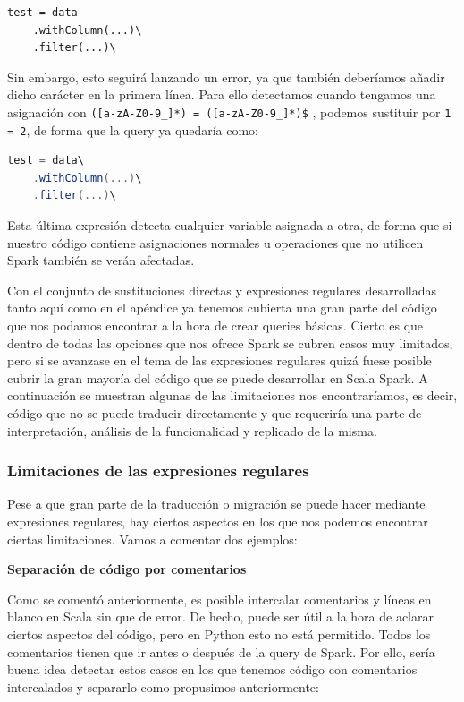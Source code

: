 \documentclass[12pt,twoside,titlepage]{report}
\begin{document}
\begin{lstlisting}
test = data
	.withColumn(...)\
	.filter(...)\
\end{lstlisting}

Sin embargo, esto seguirá lanzando un error, ya que también deberíamos añadir dicho carácter en la primera línea. Para ello detectamos cuando tengamos una asignación con \texttt{([a-zA-Z0-9\_]*) = ([a-zA-Z0-9\_]*)\$}
, podemos sustituir por \texttt{1 = 2}, de forma que la query ya quedaría como:

\begin{lstlisting}[language=scala]
test = data\
	.withColumn(...)\
	.filter(...)\
\end{lstlisting}

Esta última expresión detecta cualquier variable asignada a otra, de forma que si nuestro código contiene asignaciones normales u operaciones que no utilicen Spark también se verán afectadas.

Con el conjunto de sustituciones directas y expresiones regulares desarrolladas tanto aquí como en el apéndice ya tenemos cubierta una gran parte del código que nos podamos encontrar a la hora de crear queries básicas. Cierto es que dentro de todas las opciones que nos ofrece Spark se cubren casos muy limitados, pero si se avanzase en el tema de las expresiones regulares quizá fuese posible cubrir la gran mayoría del código que se puede desarrollar en Scala Spark. A continuación se muestran algunas de las limitaciones nos encontraríamos, es decir, código que no se puede traducir directamente y que requeriría una parte de interpretación, análisis de la funcionalidad y replicado de la misma.




\subsubsection{Limitaciones de las expresiones regulares}

Pese a que gran parte de la traducción o migración se puede hacer mediante expresiones regulares, hay ciertos aspectos en los que nos podemos encontrar ciertas limitaciones. Vamos a comentar dos ejemplos:

\textbf{Separación de código por comentarios}

Como se comentó anteriormente, es posible intercalar comentarios y líneas en blanco en Scala sin que de error. De hecho, puede ser útil a la hora de aclarar ciertos aspectos del código, pero en Python esto no está permitido. Todos los comentarios tienen que ir antes o después de la query de Spark. Por ello, sería buena idea detectar estos casos en los que tenemos código con comentarios intercalados y separarlo como propusimos anteriormente:
\end{document}
